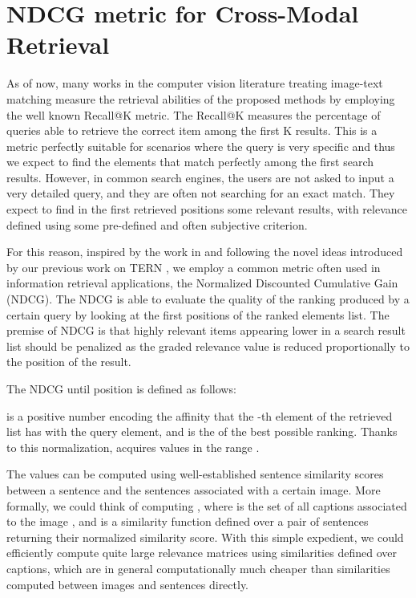 \documentclass[acmsmall]{acmart}
\begin{document}
\section{NDCG metric for Cross-Modal Retrieval}
\label{sec:computing_rel}
As of now, many works in the computer vision literature treating image-text matching measure the retrieval abilities of the proposed methods by employing the well known Recall@K metric. The Recall@K measures the percentage of queries able to retrieve the correct item among the first K results. 
This is a metric perfectly suitable for scenarios where the query is very specific and thus we expect to find the elements that match perfectly among the first search results.
However, in common search engines, the users are not asked to input a very detailed query, and they are often not searching for an exact match. They expect to find in the first retrieved positions some relevant results, with relevance defined using some pre-defined and often subjective criterion.




For this reason, inspired by the work in \cite{carrara2018pictureit} and following the novel ideas introduced by our previous work on TERN \cite{messina2020tern}, we employ a common metric often used in information retrieval applications, the Normalized Discounted Cumulative Gain (NDCG).
The NDCG is able to evaluate the quality of the ranking produced by a certain query by looking at the first  positions of the ranked elements list. 
The premise of NDCG is that highly relevant items appearing lower in a search result list should be penalized as the graded relevance value is reduced proportionally to the position of the result.

The NDCG until position  is defined as follows:


 is a positive number encoding the affinity that the -th element of the retrieved list has with the query element, and  is the  of the best possible ranking. Thanks to this normalization,  acquires values in the range . 





The  values can be computed using well-established sentence similarity scores between a sentence and the sentences associated with a certain image.
More formally, we could think of computing , where  is the set of all captions associated to the image , and  is a similarity function defined over a pair of sentences returning their normalized similarity score.
With this simple expedient, we could efficiently compute quite large relevance matrices using similarities defined over captions, which are in general computationally much cheaper than similarities computed between images and sentences directly.
\end{document}
